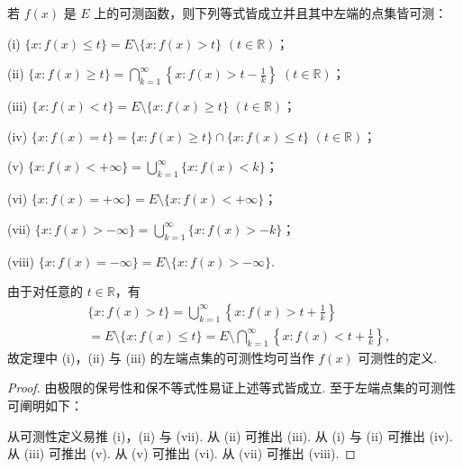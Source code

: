 \documentclass[../../main.tex]{subfiles}%
\begin{document}
\begin{theorem}\label{theorem:定理3.2}
若 \(f(x)\) 是 \(E\) 上的可测函数，则下列等式皆成立并且其中左端的点集皆可测：

(i) \(\{x: f(x) \leqslant t\} = E \setminus \{x: f(x) > t\}\) \((t \in \mathbb{R})\)；

(ii) \(\{x: f(x) \geqslant t\} = \bigcap_{k = 1}^{\infty}\left\{x: f(x) > t - \frac{1}{k}\right\}\) \((t \in \mathbb{R})\)；

(iii) \(\{x: f(x) < t\} = E \setminus \{x: f(x) \geqslant t\}\) \((t \in \mathbb{R})\)；

(iv) \(\{x: f(x) = t\} = \{x: f(x) \geqslant t\} \cap \{x: f(x) \leqslant t\}\) \((t \in \mathbb{R})\)；

(v) \(\{x: f(x) < +\infty\} = \bigcup_{k = 1}^{\infty}\{x: f(x) < k\}\)；

(vi) \(\{x: f(x) = +\infty\} = E \setminus \{x: f(x) < +\infty\}\)；

(vii) \(\{x: f(x) > -\infty\} = \bigcup_{k = 1}^{\infty}\{x: f(x) > -k\}\)；

(viii) \(\{x: f(x) = -\infty\} = E \setminus \{x: f(x) > -\infty\}\).
\end{theorem}
\begin{remark}
由于对任意的 \(t \in \mathbb{R}\)，有
\begin{align*}
&\{x: f(x) > t\} = \bigcup_{k = 1}^{\infty}\left\{x: f(x) > t + \frac{1}{k}\right\}\\
&= E \setminus \{x: f(x) \leqslant t\} = E \setminus \bigcap_{k = 1}^{\infty}\left\{x: f(x) < t + \frac{1}{k}\right\},
\end{align*}
故定理中 (i)，(ii) 与 (iii) 的左端点集的可测性均可当作 \(f(x)\) 可测性的定义. 
\end{remark}
\begin{proof}

由极限的保号性和保不等式性易证上述等式皆成立. 至于左端点集的可测性可阐明如下：

从可测性定义易推 (i)，(ii) 与 (vii). 从 (ii) 可推出 (iii). 从 (i) 与 (ii) 可推出 (iv). 从 (iii) 可推出 (v). 从 (v) 可推出 (vi). 从 (vii) 可推出 (viii). 

\end{proof}
\end{document}
